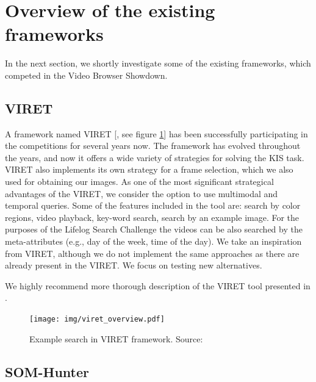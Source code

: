 \section{Overview of the existing frameworks}

In the next section, we shortly investigate some of the existing frameworks, which competed in the Video Browser Showdown. 

\subsection{VIRET}

A framework named VIRET [\cite{lokovc2019framework, lokovc2019viret}, see figure \ref{fig:viret}] has been successfully participating in the competitions for several years now. The framework has evolved throughout the years, and now it offers a wide variety of strategies for solving the KIS task. VIRET also implements its own strategy for a frame selection, which we also used for obtaining our images. As one of the most significant strategical advantages of the VIRET, we consider the option to use multimodal and temporal queries. Some of the features included in the tool are: search by color regions, video playback, key-word search, search by an example image. For the purposes of the Lifelog Search Challenge \citep{LSC20} the videos can be also searched by the meta-attributes (e.g., day of the week, time of the day). We take an inspiration from VIRET, although we do not implement the same approaches as there are already present in the VIRET. We focus on testing new alternatives.

We highly recommend more thorough description of the VIRET tool presented in \cite{kovalvcik2020viret}.

\begin{figure}
    \centering
    \texttt{[image: img/viret\_overview.pdf]}
    \caption{Example search in VIRET framework. Source: \cite{kovalvcik2020viret}}
    \label{fig:viret}
\end{figure}

\subsection{SOM-Hunter}


